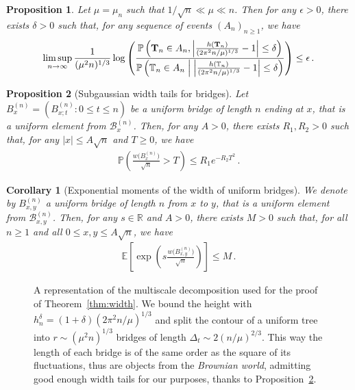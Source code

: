 \documentclass[10pt,a4paper]{amsart}
\newtheorem{proposition}{Proposition}
\newtheorem{corollary}{Corollary}
\newcommand{\CProb}[2]{\pr\left(#1 \Bigm| #2\right)}	%
\newcommand{\E}{\mathbb{E}}								%
\newcommand{\Exp}[1]{\E\left[#1\right]}					%
\newcommand{\Prob}[1]{\pr\left(#1\right)}					%
\newcommand{\R}{\mathbb R}
\newcommand{\T}{\mathbb T}
\newcommand{\bT}{\mathbf T}
\newcommand{\cB}{\mathcal B}
\newcommand{\pr}{\mathbb{P}}								%
\begin{document}
\begin{proposition}\label{prop:contour_random_narrow_exc_pos}
    Let $\mu=\mu_n$ such that $1/\sqrt{n}\ll\mu\ll n$.
    Then for any $\epsilon>0$, there exists $\delta>0$ such that, for any sequence of events $(A_n)_{n\geq1}$, we have
    \begin{align*}
        \limsup_{n\rightarrow\infty}\frac{1}{(\mu^2n)^{1/3}}\log\left(\frac{\Prob{\bT_n\in A_n,\left|\frac{h(\bT_n)}{(2\pi^2n/\mu)^{1/3}}-1\right|\leq\delta}}{\CProb{\T_n\in A_n}{\left|\frac{h(\T_n)}{(2\pi^2n/\mu)^{1/3}}-1\right|\leq\delta}}\right)\leq\epsilon\,.
    \end{align*}
\end{proposition}

\begin{proposition}[Subgaussian width tails for bridges] \label{prop:bridge_subg_tail}
    Let $B^{(n)}_x=(B^{(n)}_{x;t}:0\leq t \leq n)$ be a uniform bridge of length $n$ ending at $x$, that is a uniform element from $\cB^{(n)}_x$.
    Then, for any $A>0$, there exists $R_1,R_2>0$ such that, for any $|x|\leq A\sqrt{n}$ and $T\geq0$, we have
    \begin{align*}
        \Prob{\frac{w\big(B^{(n)}_x\big)}{\sqrt{n}}>T}\leq R_1e^{-R_2T^2}\,.
    \end{align*}
\end{proposition}

\begin{corollary}[Exponential moments of the width of uniform bridges]\label{cor:exp_mom_local_time}
    We denote by $B^{(n)}_{x,y}$ a uniform bridge of length $n$ from $x$ to $y$, that is a uniform element from $\cB^{(n)}_{x,y}$.
    Then, for any $s\in\R$ and $A>0$, there exists $M>0$ such that, for all $n\geq1$ and all $0\leq x,y\leq A\sqrt{n}$, we have
    \begin{align*}
        \Exp{\exp\left(s\frac{w\big(B^{(n)}_{x,y}\big)}{\sqrt{n}}\right)}\leq M\,.
    \end{align*}
\end{corollary}

\begin{figure}[H]
    \centering
    
    \caption{A representation of the multiscale decomposition used for the proof of Theorem~\ref{thm:width}. We bound the height with $h_n^\delta=(1+\delta)(2\pi^2n/\mu)^{1/3}$ and split the contour of a uniform tree into $r\sim(\mu^2n)^{1/3}$ bridges of length $\Delta_t\sim2(n/\mu)^{2/3}$. This way the length of each bridge is of the same order as the square of its fluctuations, thus are objects from the \emph{Brownian world}, admitting good enough width tails for our purposes, thanks to Proposition~\ref{prop:bridge_subg_tail}.}
    \label{fig:broscale}
\end{figure}
\end{document}
